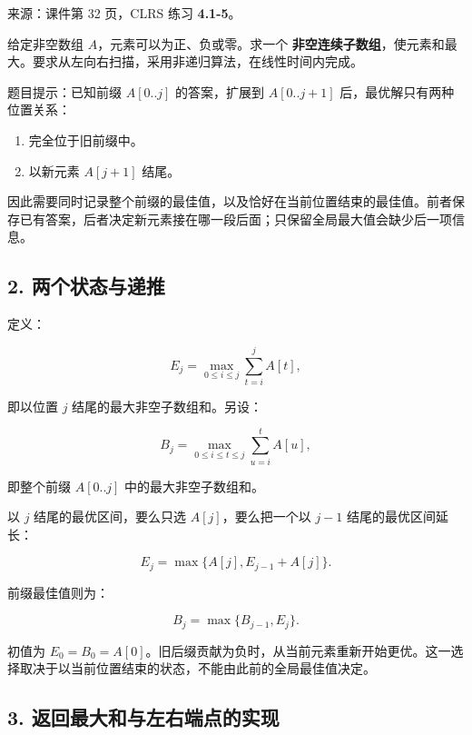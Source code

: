 \documentclass[
  UTF8,fontset=none,zihao=5]{ctexart}
\providecommand{\tightlist}{%
  \setlength{\itemsep}{0pt}\setlength{\parskip}{0pt}}
\let\OldSubsection\subsection
\renewcommand{\subsection}{\Needspace{4\baselineskip}\OldSubsection}
\begin{document}
来源：课件第 32 页，CLRS 练习 \textbf{4.1-5}。

给定非空数组 \(A\)，元素可以为正、负或零。求一个
\textbf{非空连续子数组}，使元素和最大。要求从左向右扫描，采用非递归算法，在线性时间内完成。

题目提示：已知前缀 \(A[0..j]\) 的答案，扩展到 \(A[0..j+1]\)
后，最优解只有两种位置关系：

\begin{enumerate}
\def\labelenumi{\arabic{enumi}.}
\tightlist
\item
  完全位于旧前缀中。
\item
  以新元素 \(A[j+1]\) 结尾。
\end{enumerate}

因此需要同时记录整个前缀的最佳值，以及恰好在当前位置结束的最佳值。前者保存已有答案，后者决定新元素接在哪一段后面；只保留全局最大值会缺少后一项信息。

\hypertarget{ux4e24ux4e2aux72b6ux6001ux4e0eux9012ux63a8}{%
\subsection{2.
两个状态与递推}\label{ux4e24ux4e2aux72b6ux6001ux4e0eux9012ux63a8}}

定义：

\[
E_j=\max_{0\le i\le j}\sum_{t=i}^{j}A[t],
\]

即以位置 \(j\) 结尾的最大非空子数组和。另设：

\[
B_j=\max_{0\le i\le t\le j}\sum_{u=i}^{t}A[u],
\]

即整个前缀 \(A[0..j]\) 中的最大非空子数组和。

以 \(j\) 结尾的最优区间，要么只选 \(A[j]\)，要么把一个以 \(j-1\)
结尾的最优区间延长：

\[
E_j=\max\{A[j],E_{j-1}+A[j]\}.
\]

前缀最佳值则为：

\[
B_j=\max\{B_{j-1},E_j\}.
\]

初值为
\(E_0=B_0=A[0]\)。旧后缀贡献为负时，从当前元素重新开始更优。这一选择取决于以当前位置结束的状态，不能由此前的全局最佳值决定。

\hypertarget{ux8fd4ux56deux6700ux5927ux548cux4e0eux5de6ux53f3ux7aefux70b9ux7684ux5b9eux73b0}{%
\subsection{3.
返回最大和与左右端点的实现}\label{ux8fd4ux56deux6700ux5927ux548cux4e0eux5de6ux53f3ux7aefux70b9ux7684ux5b9eux73b0}}
\end{document}

